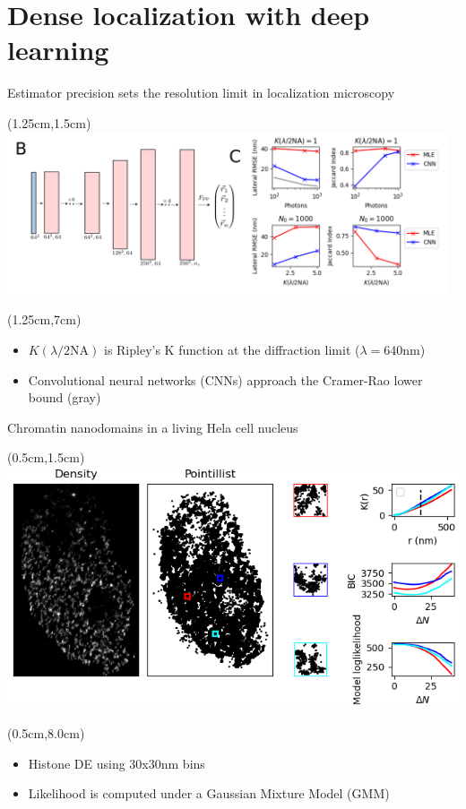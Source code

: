 \documentclass{beamer}					%
\begin{document}
\section{Dense localization with deep learning}

\begin{frame}{Estimator precision sets the resolution limit in localization microscopy}

\begin{textblock*}{10cm}(1.25cm,1.5cm)
\includegraphics[width=13cm]{PSF2D-Crop.png}
\end{textblock*}
\begin{textblock*}{13cm}(1.25cm,7cm)
\begin{itemize}
\item $K(\lambda/2\mathrm{NA})$ is Ripley's K function at the diffraction limit ($\lambda=640\mathrm{nm}$)
\item Convolutional neural networks (CNNs) approach the Cramer-Rao lower bound (gray)
\end{itemize}
\end{textblock*}

\end{frame}

\begin{frame}{Chromatin nanodomains in a living Hela cell nucleus}

\begin{textblock*}{13cm}(0.5cm,1.5cm)
\includegraphics[width=\textwidth]{Cluster.png}
\end{textblock*}

\begin{textblock*}{13cm}(0.5cm,8.0cm)
\begin{itemize}
\item Histone DE using 30x30nm bins
\item Likelihood is computed under a Gaussian Mixture Model (GMM)
\end{itemize}
\end{textblock*}

\end{frame}
\end{document}
